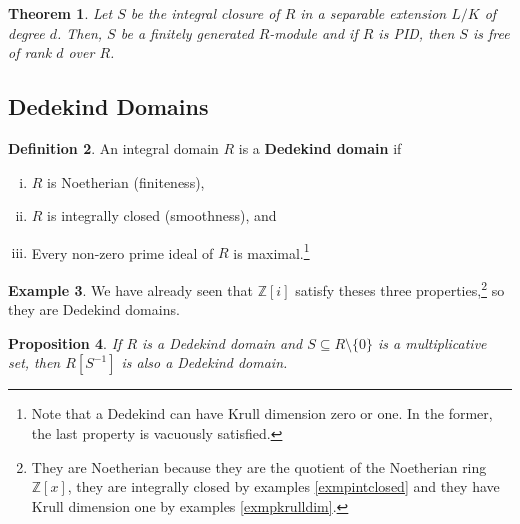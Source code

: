 \documentclass{tufte-handout} %
\newtheorem{thm}{Theorem}
\newtheorem{prop}[thm]{Proposition}
\theoremstyle{definition}
\newtheorem{defn}[thm]{Definition}
\newtheorem{exmp}[thm]{Example}
\theoremstyle{remark}
\newcommand{\Z}{\mathbb{Z}}
\begin{document}
\begin{thm}\label{intclosefingen}%
	Let $S$ be the integral closure of $R$ in a separable extension $L/K$ of degree $d$. Then, $S$ be a finitely generated $R$-module and if $R$ is PID, then $S$ is free of rank $d$ over $R$.
\end{thm}

\subsection{Dedekind Domains}
\begin{defn}
	An integral domain $R$ is a \textbf{Dedekind domain} if 
	\begin{enumerate}[(i)]
		\item $R$ is Noetherian (finiteness),
		\item $R$ is integrally closed (smoothness), and
		\item Every non-zero prime ideal of $R$ is maximal.\footnote{Note that a Dedekind can have Krull dimension zero or one. In the former, the last property is vacuously satisfied.}
	\end{enumerate}
\end{defn}
\begin{exmp}
    We have already seen that $\Z[i]$ satisfy theses three properties,\footnote{They are Noetherian because they are the quotient of the Noetherian ring $\Z[x]$, they are integrally closed by examples \ref{exmpintclosed} and they have Krull dimension one by examples \ref{exmpkrulldim}.} so they are Dedekind domains.
\end{exmp}
\begin{prop}
	If $R$ is a Dedekind domain and $S \subseteq R\setminus \{0\}$ is a multiplicative set, then $R[S^{-1}]$ is also a Dedekind domain.
\end{prop}
\end{document}

